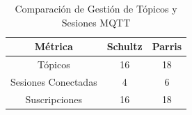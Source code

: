 \begin{table}[H]
\centering
\begin{tabular}{|c|c|c|}
\hline
\textbf{Métrica} & \textbf{Schultz} & \textbf{Parris} \\
\hline
\hspace{30pt}Tópicos\hspace{30pt} &
\hspace{30pt}16\hspace{30pt} & 
\hspace{30pt}18\hspace{30pt} \\
\hline
\hspace{30pt}Sesiones Conectadas\hspace{30pt} &
\hspace{30pt}4\hspace{30pt} & 
\hspace{30pt}6\hspace{30pt} \\
\hline
\hspace{30pt}Suscripciones\hspace{30pt} &
\hspace{30pt}16\hspace{30pt} & 
\hspace{30pt}18\hspace{30pt} \\
\hline
\end{tabular}
\caption{Comparación de Gestión de Tópicos y Sesiones MQTT}
\label{topics_com}
\end{table}
